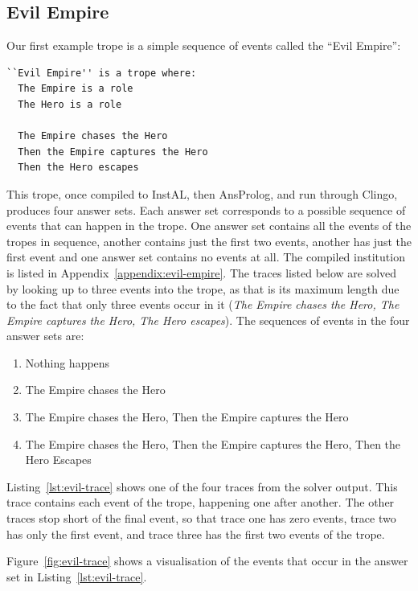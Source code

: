 \documentclass[11pt]{report}
\begin{document}
\subsection{Evil Empire}
Our first example trope is a simple sequence of events called the ``Evil Empire'':

\begin{lstlisting}[label={lst:evil-empire}, caption={The ``Evil Empire'' trope}]
``Evil Empire'' is a trope where:
  The Empire is a role
  The Hero is a role

  The Empire chases the Hero
  Then the Empire captures the Hero
  Then the Hero escapes
\end{lstlisting}

This trope, once compiled to InstAL, then AnsProlog, and run through Clingo,
produces four answer sets. Each answer set corresponds to a possible sequence of
events that can happen in the trope. One answer set contains all the events of
the tropes in sequence, another contains just the first two events, another has
just the first event and one answer set contains no events at all. The compiled institution is listed in
Appendix~\ref{appendix:evil-empire}. The traces listed below are solved by
looking up to three events into the trope, as that is its maximum length due to
the fact that only three events occur in it (\emph{The Empire chases the Hero,
  The Empire captures the Hero, The Hero escapes}). The sequences of events in the four
answer sets are:

\begin{enumerate}
  \item Nothing happens
  \item The Empire chases the Hero
  \item The Empire chases the Hero, Then the Empire captures the Hero
  \item The Empire chases the Hero, Then the Empire captures the Hero, Then the
    Hero Escapes
\end{enumerate}


Listing~\ref{lst:evil-trace} shows one of the four traces from the solver
output. This trace contains each event of the trope, happening one after
another. The other traces stop short of the final event, so that trace one has
zero events, trace two has only the first event, and trace three has the first
two events of the trope. 

Figure~\ref{fig:evil-trace} shows a visualisation of the events that occur in
the answer set in Listing~\ref{lst:evil-trace}.
\end{document}
